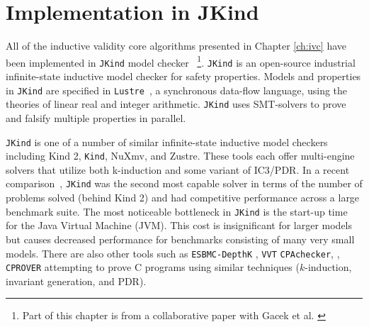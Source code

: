 \chapter{Implementation in {\sc JKind}}
\label{ch:impl}

\newcommand{\jkind}{\texttt{JKind}\xspace}
\newcommand{\kind}{\texttt{Kind}\xspace}
\newcommand{\jkindapi}{\texttt{JKindApi}\xspace}
\newcommand{\lustre}{\texttt{Lustre}\xspace}
\newcommand{\spear}{\texttt{SpeAR}\xspace}
\newcommand{\simpal}{\texttt{SIMPAL}\xspace}
\newcommand{\limp}{\texttt{Limp}\xspace}
\newcommand{\agree}{\texttt{AGREE}\xspace}
\newcommand{\gryphon}{\texttt{Gryphon}\xspace}

\renewcommand{\paragraph}[1]{\vspace{5pt}\noindent {\bf #1}}
\newcommand{\application}[2]{
  \paragraph{#1} \hfill {\it #2}
  \vspace{1pt}
}

All of the inductive validity core algorithms presented in Chapter \ref{ch:ivc} have been implemented in \texttt{JKind} model checker ~\cite{jkind}\footnote{Part of this chapter is from a collaborative paper with Gacek et al. \cite{jkindpaper}}. \jkind is an
open-source industrial
infinite-state inductive model checker for safety properties. Models
and properties in \jkind are specified in
\lustre~\cite{halbwachs1991ieee}, a synchronous data-flow language,
using the theories of linear real and integer arithmetic. \jkind uses
SMT-solvers to prove and falsify multiple properties in parallel.

\jkind is one of a number of similar infinite-state inductive model
checkers including {\sc Kind 2}, \kind, {\sc NuXmv}, and {\sc
  Zustre}. These tools each offer multi-engine solvers that utilize
both k-induction and some variant of IC3/PDR. In a recent
comparison~\cite{champion2016cav}, \jkind was the second most capable
solver in terms of the number of problems solved (behind {\sc Kind 2})
and had competitive performance across a large benchmark suite. The
most noticeable bottleneck in \jkind is the start-up time for the Java
Virtual Machine (JVM). This cost is insignificant for larger models
but causes decreased performance for benchmarks consisting of many
very small models.
There are also other tools such as \texttt{ESBMC-DepthK} \cite{rocha2017model},  \texttt{VVT} \cite{beyer2016smt} \texttt{CPAchecker}, \cite{beyer2015boosting}, \texttt{CPROVER} \cite{brain2015safety} attempting to prove C programs using similar techniques ($k$-induction, invariant generation, and PDR).

